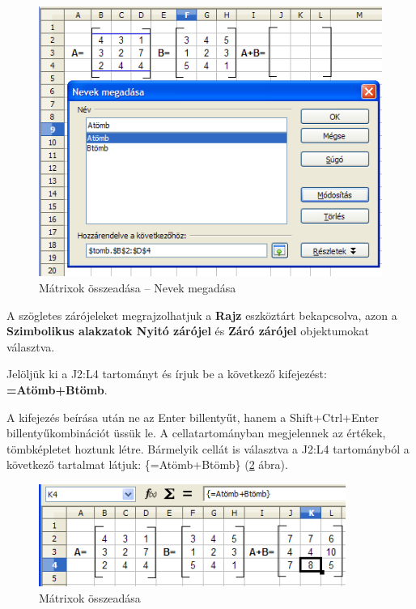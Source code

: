 \begin{figure}[!h]
\begin{center}
\includegraphics[width=12.751cm]{oocalcv2-img130.png}
\caption{Mátrixok összeadása -- Nevek megadása}\label{MátrixokÖsszeadásaNevek}
\end{center}
\end{figure}

A szögletes zárójeleket megrajzolhatjuk a \textbf{Rajz}
eszköztárt bekapcsolva, azon a \textbf{Szimbolikus alakzatok
Nyitó zárójel} és \textbf{Záró zárójel} objektumokat választva.

Jelöljük ki a J2:L4 tartományt és írjuk be a következő
kifejezést: {\sffamily\bfseries{=Atömb+Btömb}}.

A kifejezés beírása után ne az Enter billentyűt, hanem a
Shift+Ctrl+Enter billentyűkombinációt üssük le. A
cellatartományban megjelennek az értékek, tömbképletet
hoztunk létre. Bármelyik cellát is választva a J2:L4
tartományból a következő tartalmat látjuk:
\{=Atömb+Btömb\} (\ref{MátrixokÖsszeadása} ábra).

\begin{figure}[!h]
\begin{center}
\includegraphics[width=10.031cm]{oocalcv2-img131.png}
\caption{Mátrixok összeadása}\label{MátrixokÖsszeadása}
\end{center}
\end{figure}

